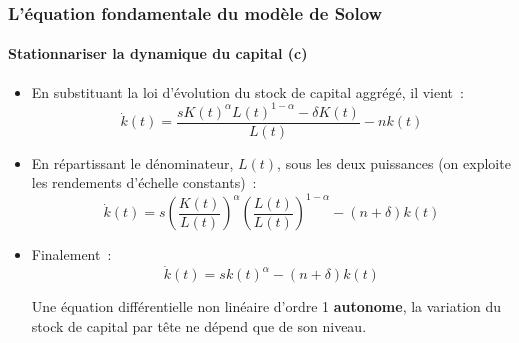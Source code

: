 \documentclass[10pt,notheorems]{beamer}
\theoremstyle{plain}
\theoremstyle{definition} %
\begin{document}
\begin{frame}
  \frametitle{L'équation fondamentale du modèle de Solow}
  \framesubtitle{Stationnariser la dynamique du capital (c)}

  \bigskip

  \begin{itemize}

  \item En substituant la loi d'évolution du stock de capital aggrégé, il vient~:
    \[
      \dot k(t) = \frac{s K(t)^{\alpha}L(t)^{1-\alpha}-\delta K(t)}{L(t)} - nk(t)
    \]

    \bigskip

  \item En répartissant le dénominateur, $L(t)$, sous les deux puissances (on exploite les rendements d'échelle constants)~:
    \[
      \dot k(t) = s \left(\frac{K(t)}{L(t)}\right)^{\alpha}\left(\frac{L(t)}{L(t)}\right)^{1-\alpha} - (n+\delta)k(t)
    \]

    \bigskip

  \item Finalement~:
    \[
      \dot k(t) = s k(t)^{\alpha} - (n+\delta)k(t)
    \]

    \medskip

    Une équation différentielle non linéaire d'ordre 1 \textbf{autonome}, la variation du stock de capital par tête ne dépend que de son niveau.\newline
  \end{itemize}

\end{frame}
\end{document}
